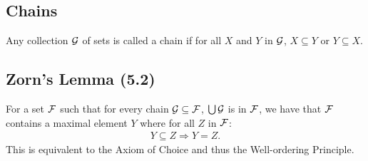 \subsection{Chains}

Any collection $\mathcal{G}$ of sets is called a chain if for all $X$
and $Y$ in $\mathcal{G}$, $X \subseteq Y$ or $Y \subseteq X$.

\subsection{Zorn's Lemma (5.2)} \label{5.2}

For a set $\mathcal{F}$ such that for every chain $\mathcal{G} \subseteq \mathcal{F}$,
$\bigcup \mathcal{G}$ is in $\mathcal{F}$, we have that $\mathcal{F}$ contains a
maximal element $Y$ where for all $Z$ in $\mathcal{F}$: \begin{align*}
    Y \subseteq Z \Longrightarrow Y = Z.
\end{align*} This is equivalent to the Axiom of Choice and thus the 
Well-ordering Principle.

